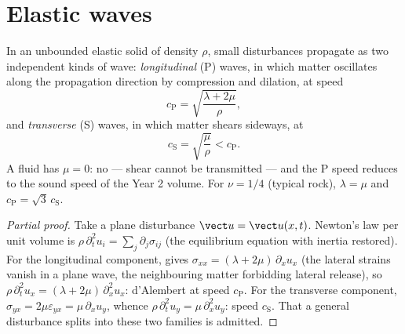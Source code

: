 \section{Elastic waves}

\begin{proposition}\label{prop:b3:continuum-elasticity:waves}
In an unbounded elastic solid of density $\rho$, small disturbances
propagate as two independent kinds of wave:
\emph{longitudinal} (P) waves, in which matter oscillates along the
propagation direction by compression and dilation, at speed
\[
c_{\text{P}} = \sqrt{\frac{\lambda + 2\mu}{\rho}} ,
\]
and \emph{transverse} (S) waves, in which matter shears sideways, at
\[
c_{\text{S}} = \sqrt{\frac{\mu}{\rho}} < c_{\text{P}} .
\]
A fluid has $\mu = 0$: no  --- shear cannot be transmitted ---
and the P speed reduces to the sound speed of the Year 2 volume. For
$\nu = 1/4$ (typical rock), $\lambda = \mu$ and $c_{\text{P}} =
\sqrt3\,c_{\text{S}}$.
\end{proposition}

\begin{proof}[Partial proof]
Take a plane disturbance $\vect u = \vect u(x, t)$. Newton's law per
unit volume is $\rho\,\partial_t^2u_i = \sum_j\partial_j\sigma_{ij}$
(the equilibrium equation with inertia restored). For the longitudinal
component,  gives $\sigma_{xx} = (\lambda +
2\mu)\,\partial_xu_x$ (the lateral strains vanish in a plane wave, the
neighbouring matter forbidding lateral release), so
$\rho\,\partial_t^2u_x = (\lambda + 2\mu)\,\partial_x^2u_x$: d'Alembert
at speed $c_{\text{P}}$. For the transverse component, $\sigma_{yx} =
2\mu\varepsilon_{yx} = \mu\,\partial_xu_y$, whence
$\rho\,\partial_t^2u_y = \mu\,\partial_x^2u_y$: speed $c_{\text{S}}$.
That a general disturbance splits into these two families is admitted.
\end{proof}

